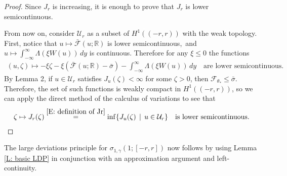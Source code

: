 \documentclass[10pt,a4paper]{amsart}
\begin{document}
	
		\begin{proof} Since $J_{r}$ is increasing, it is enough to prove that $ J_{ r } $ is lower semicontinuous.
		
		From now on, consider $\mathcal{U}_{r}$ as a subset of $H^{1}((-r,r))$ with the weak topology.  First, notice that $ u \mapsto \bar{\mathscr{F}} ( u ; \mathbb{R} ) $ is lower semicontinuous,~and $ u \mapsto \int_{ -\infty }^{ \infty} \Lambda ( \xi W ( u ) ) \, dy $ is continuous. Therefore for any $ \xi \leq 0 $ the functions
		\begin{align*}
			( u , \zeta ) \mapsto - \xi \zeta - \xi (\bar{\mathscr{F}} ( u ; \mathbb{R} ) - \bar \sigma ) -  \int_{ -\infty }^{ \infty} \Lambda ( \xi W ( u ) ) \, dy
			\quad \text{are~lower semicontinuous}.
		\end{align*}
		By Lemma 2, if $u \in \mathcal{U}_{r}$ satisfies $J_{u}(\zeta) < \infty$ for some $\zeta > 0$, then $\mathscr{F}_{\theta_{*}} \leq \bar{\sigma}$.  Therefore, the set of such functions is weakly compact in $H^{1}((-r,r))$, so we can apply the direct method of the calculus of variations to see that
		\begin{align*}
			\zeta \mapsto J_{r} ( \zeta ) \stackrel{ \eqref{E: definition of Jr} }{ = } \inf \{ J_{ u } ( \zeta ) \, \mid \, u \in \mathcal{U}_{r} \}
			\quad \text{is lower semicontinuous}.
		\end{align*}
    \end{proof}
   
The large deviations principle for $\sigma_{1,\gamma}(1;[-r,r])$ now follows by using Lemma \ref{L: basic LDP} in conjunction with an approximation argument and left-continuity.
 
\end{document}
